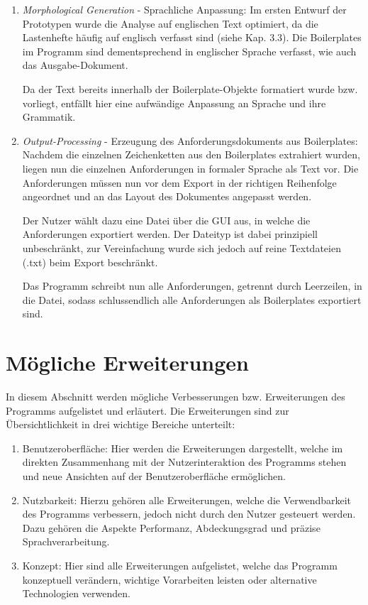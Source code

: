 \documentclass[12pt]{report}
\begin{document}
\begin{enumerate}
\item \textit{Morphological Generation} - Sprachliche Anpassung: Im ersten Entwurf der Prototypen wurde die Analyse auf englischen Text optimiert, da die Lastenhefte häufig auf englisch verfasst sind (siehe Kap. 3.3). Die Boilerplates im Programm sind dementsprechend in englischer Sprache verfasst, wie auch das Ausgabe-Dokument.

Da der Text bereits innerhalb der Boilerplate-Objekte formatiert wurde bzw. vorliegt, entfällt hier eine aufwändige Anpassung an Sprache und ihre Grammatik.

\item \textit{Output-Processing} - Erzeugung des Anforderungsdokuments aus Boilerplates: Nachdem die einzelnen Zeichenketten aus den Boilerplates extrahiert wurden, liegen nun die einzelnen Anforderungen in formaler Sprache als Text vor. Die Anforderungen müssen nun vor dem Export in der richtigen Reihenfolge angeordnet und an das Layout des Dokumentes angepasst werden.

Der Nutzer wählt dazu eine Datei über die GUI aus, in welche die Anforderungen exportiert werden. Der Dateityp ist dabei prinzipiell unbeschränkt, zur Vereinfachung wurde sich jedoch auf reine Textdateien (.txt) beim Export beschränkt. 

Das Programm schreibt nun alle Anforderungen, getrennt durch Leerzeilen, in die Datei, sodass schlussendlich alle Anforderungen als Boilerplates exportiert sind.
\end{enumerate}

\section{Mögliche Erweiterungen}
In diesem Abschnitt werden mögliche Verbesserungen bzw. Erweiterungen des Programms aufgelistet und erläutert. Die Erweiterungen sind zur Übersichtlichkeit in drei wichtige Bereiche unterteilt:

\begin{enumerate}
\item Benutzeroberfläche: Hier werden die Erweiterungen dargestellt, welche im direkten Zusammenhang mit der Nutzerinteraktion des Programms stehen und neue Ansichten auf der Benutzeroberfläche ermöglichen. 
\item Nutzbarkeit: Hierzu gehören alle Erweiterungen, welche die Verwendbarkeit des Programms verbessern, jedoch nicht durch den Nutzer gesteuert werden. Dazu gehören die Aspekte Performanz, Abdeckungsgrad und präzise Sprachverarbeitung.
\item Konzept: Hier sind alle Erweiterungen aufgelistet, welche das Programm konzeptuell verändern, wichtige Vorarbeiten leisten oder alternative Technologien verwenden.  
\end{enumerate}
\end{document}

